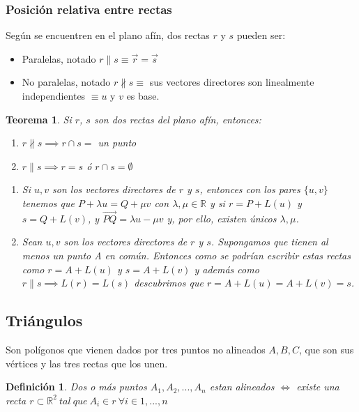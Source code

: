 \documentclass[11pt, a4paper, titlepage]{article}
\makeatletter
\renewenvironment{proof}[1][\proofname] {\vspace{-15pt}\par\pushQED{\qed}\normalfont\topsep6\p@\@plus6\p@\relax\trivlist\item[\hskip\labelsep\it#1\@addpunct{.}]\ignorespaces}{\popQED\endtrivlist\@endpefalse}
\newcommand{\R}{\mathbb{R}}
\theoremstyle{theorem-style}
\newtheorem*{nth}{Teorema}
\theoremstyle{definition-style}
\newtheorem*{ndef}{Definición}
\theoremstyle{remark-style}
\theoremstyle{example-style}
\newenvironment{nlist}
{\begin{enumerate}
\renewcommand\labelenumi{(\emph{\roman{enumi})}}}
{\end{enumerate}}
\makeatother
\begin{document}
\subsubsection{Posición relativa entre rectas}
Según se encuentren en el plano afín, dos rectas $r$ y $s$ pueden ser:
\begin{itemize}
	\item Paralelas, notado $r\parallel s \equiv \vec{r} = \vec{s}$
	\item No paralelas, notado $r\nparallel s \equiv$  sus vectores directores son linealmente independientes $\equiv u$ y $v$ es base.
\end{itemize}

\begin{nth}
	Si $r$, $s$ son dos rectas del plano afín, entonces:
	\begin{nlist}
	\item $r \nparallel s\implies r \cap s = $ un punto
	\item $r \parallel s \implies r = s$ ó $r \cap s =  \emptyset$
\end{nlist}
\begin{proof}
	\begin{nlist}
	\item Si $u,v$ son los vectores directores de $r$ y $s$, entonces con los pares $\{u,v\}$ tenemos que $P+\lambda u = Q + \mu v$ con $\lambda, \mu \in \R$
y si $r = P +L(u)$ y $s=Q+L(v)$, y $\overrightarrow{PQ} = \lambda u - \mu v $ y, por ello, existen únicos $\lambda, \mu$.
\item Sean $u,v$ son los vectores directores de $r$ y $s$. Supongamos que tienen al menos un punto  A en común. Entonces como se podrían escribir estas rectas como $r = A +L(u)$ y $s=A+L(v)$ y además como $r \parallel s \implies L(r)=L(s)$ descubrimos que $r = A +L(u)=A+L(v) = s$.
\end{nlist}
\end{proof}
\end{nth}




\subsection{Triángulos}
Son polígonos que vienen dados por tres puntos no alineados $A,B,C$, que son sus vértices y las tres rectas que los unen.

\begin {ndef}
	Dos o más puntos $A_1, A_2, ... , A_n $ estan alineados $\iff$ existe una recta $r \subset \mathbb{R}^2\ tal\ que\ A_i \in r\ \forall i \in 1,...,n$
\end{ndef}
\end{document}
